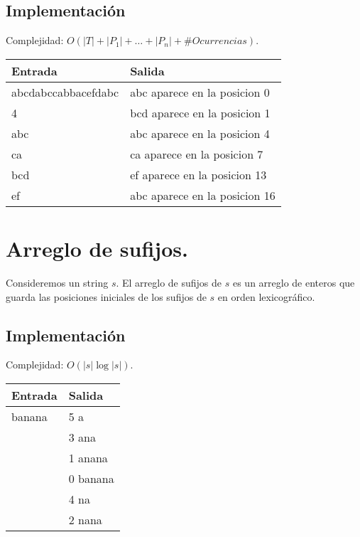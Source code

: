 \documentclass[12pt, letterpaper, twoside]{article}
\begin{document}
\subsection{Implementación}

Complejidad: $O(|T| + |P_1| + \ldots + |P_n| + \#Ocurrencias)$.

 \medskip

\begin{tabular}{|p{7cm}|p{7cm}|}
\hline
\textbf{Entrada} & \textbf{Salida}\\ \hline
abcdabccabbacefdabc & abc aparece en la posicion 0\\
4                   & bcd aparece en la posicion 1\\
abc                 & abc aparece en la posicion 4\\
ca                  & ca aparece en la posicion 7\\
bcd                 & ef aparece en la posicion 13\\
ef                  & abc aparece en la posicion 16\\ \hline
\end{tabular}

\newpage

\section{Arreglo de sufijos.}

Consideremos un string $s$. El arreglo de sufijos de $s$ es un arreglo de enteros que guarda las posiciones iniciales de los sufijos de $s$ en orden lexicográfico.

\subsection{Implementación}

Complejidad: $O(|s|\log |s|)$.

 \medskip

\begin{tabular}{|p{7cm}|p{7cm}|}
\hline
\textbf{Entrada} & \textbf{Salida}\\ \hline
banana & 5 a\\
       & 3 ana\\
       & 1 anana\\
       & 0 banana\\
       & 4 na\\
       & 2 nana\\ \hline
\end{tabular}

\newpage
\end{document}
